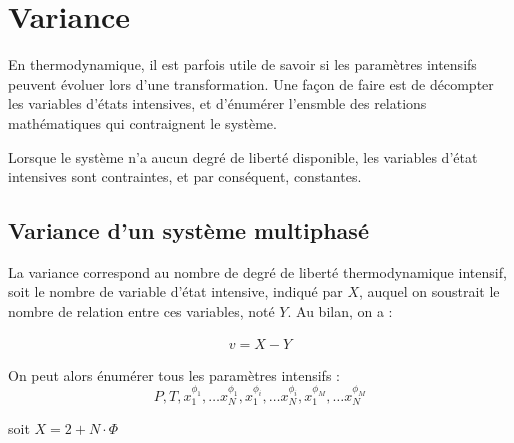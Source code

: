 \documentclass[a4paper]{book}
\begin{document}

\section{Variance}

En thermodynamique, il est parfois utile de savoir si les paramètres intensifs peuvent évoluer lors d'une transformation. Une façon de faire est de décompter les variables d'états intensives, et d'énumérer l'ensmble des relations mathématiques qui contraignent le système.

Lorsque le système n'a aucun degré de liberté disponible, les variables d'état intensives sont contraintes, et par conséquent, constantes.

\subsection{Variance d'un système multiphasé}

La variance correspond au nombre de degré de liberté thermodynamique intensif, soit le nombre de variable d'état intensive, indiqué par $X$, auquel on soustrait le nombre de relation entre ces variables, noté $Y$. Au bilan, on a : 

\begin{align}
v = X - Y
\end{align}

On peut alors énumérer tous les paramètres intensifs :
\begin{equation}
P, T, x^{\phi_1}_1, \ldots x^{\phi_1}_N, x^{\phi_i}_1, \ldots x^{\phi_i}_N, x^{\phi_M}_1, \ldots x^{\phi_M}_N
\end{equation}

soit $X = 2 + N \cdot \Phi $
\end{document}
